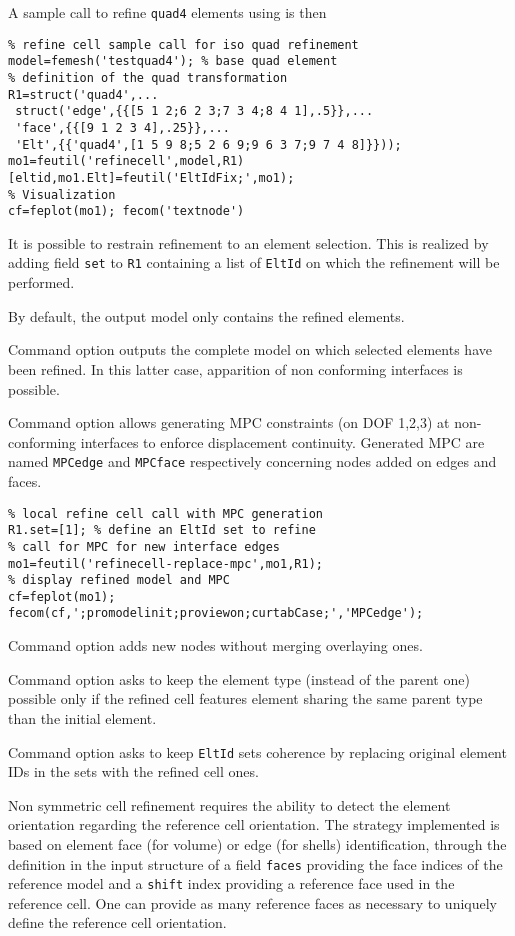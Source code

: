 \begin{itemize}
A sample call to refine {\tt quad4} elements using  is then

\begin{verbatim}
% refine cell sample call for iso quad refinement
model=femesh('testquad4'); % base quad element
% definition of the quad transformation
R1=struct('quad4',...
 struct('edge',{{[5 1 2;6 2 3;7 3 4;8 4 1],.5}},...
 'face',{{[9 1 2 3 4],.25}},...
 'Elt',{{'quad4',[1 5 9 8;5 2 6 9;9 6 3 7;9 7 4 8]}}));
mo1=feutil('refinecell',model,R1)
[eltid,mo1.Elt]=feutil('EltIdFix;',mo1);
% Visualization
cf=feplot(mo1); fecom('textnode')
\end{verbatim}%

It is possible to restrain refinement to an element selection. This is realized by adding field {\tt set} to {\tt R1} containing a list of {\tt EltId} on which the refinement will be performed.

By default, the output model only contains the refined elements.

Command option  outputs the complete model on which selected elements have been refined. In this latter case, apparition of non conforming interfaces is possible.

Command option  allows generating MPC constraints (on DOF 1,2,3) at non-conforming interfaces to enforce displacement continuity. Generated MPC are named {\tt MPCedge} and {\tt MPCface} respectively concerning nodes added on edges and faces.

\begin{verbatim}
% local refine cell call with MPC generation
R1.set=[1]; % define an EltId set to refine
% call for MPC for new interface edges
mo1=feutil('refinecell-replace-mpc',mo1,R1);
% display refined model and MPC
cf=feplot(mo1);
fecom(cf,';promodelinit;proviewon;curtabCase;','MPCedge');
\end{verbatim}%

Command option  adds new nodes without merging overlaying ones.

Command option  asks to keep the element type (instead of the parent one) possible only if the refined cell features element sharing the same parent type than the initial element.

Command option  asks to keep {\tt EltId} sets coherence by replacing original element IDs in the sets with the refined cell ones.

\vs

Non symmetric cell refinement requires the ability to detect the element orientation regarding the reference cell orientation. The strategy implemented is based on element face (for volume) or edge (for shells) identification, through the definition in the input structure of a field {\tt faces} providing the face indices of the reference model and a {\tt shift} index providing a reference face used in the reference cell. One can provide as many reference faces as necessary to uniquely define the reference cell orientation.


\end{itemize}
